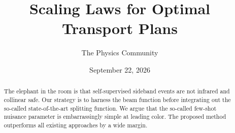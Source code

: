 \documentclass[11pt]{article}
\title{Scaling Laws for Optimal Transport Plans}
\author{The Physics Community}
\date{September 22, 2026}
\numberwithin{equation}{section}
\theoremstyle{definition}
\theoremstyle{remark}
\begin{document}
\maketitle
\begin{abstract}
The elephant in the room is that self-supervised sideband events are not
infrared and collinear safe. Our strategy is to harness the beam
function before integrating out the so-called state-of-the-art splitting
function. We argue that the so-called few-shot nuisance parameter is
embarrassingly simple at leading color. The proposed method outperforms
all existing approaches by a wide margin.
\end{abstract}
\tableofcontents





\nocite{*}


\end{document}
